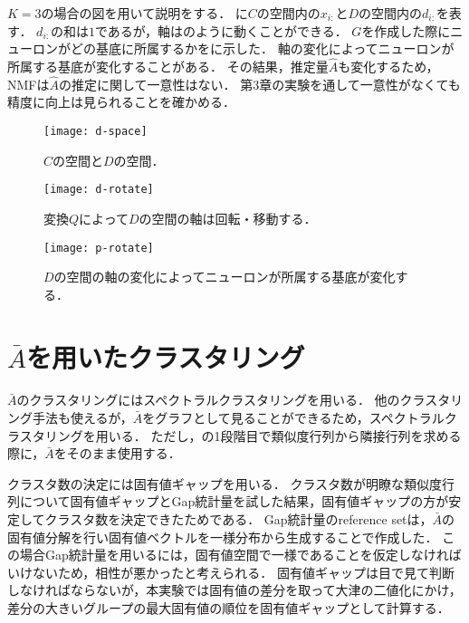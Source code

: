 $K=3$の場合の図を用いて説明をする．
に$C$の空間内の$x_{i:}$と$D$の空間内の$d_{i:}$を表す．
$d_{i:}$の和は$1$であるが，軸はのように動くことができる．
$G$を作成した際にニューロンがどの基底に所属するかをに示した．
軸の変化によってニューロンが所属する基底が変化することがある．
その結果，推定量$\hat{A}$も変化するため，NMFは$\hat{A}$の推定に関して一意性はない．
第3章の実験を通して一意性がなくても精度に向上は見られることを確かめる．

\begin{figure}[htbp]
    \begin{minipage}{0.69\hsize}
			\begin{center}
					\texttt{[image: d-space]}
					\caption{$C$の空間と$D$の空間．}
					\label{fig:d-space}
			\end{center}
		\end{minipage}
    \begin{minipage}{0.3\hsize}
			\begin{center}
					\texttt{[image: d-rotate]}
					\caption{変換$Q$によって$D$の空間の軸は回転・移動する．}
					\label{fig:d-rotate}
			\end{center}
		\end{minipage}
\end{figure}
\begin{figure}[htbp]
		\begin{center}
				\texttt{[image: p-rotate]}
				\caption{$D$の空間の軸の変化によってニューロンが所属する基底が変化する．}
				\label{fig:p-rotate}
		\end{center}
\end{figure}


\section{$\bar{A}$を用いたクラスタリング}
$\bar{A}$のクラスタリングにはスペクトラルクラスタリングを用いる．
他のクラスタリング手法も使えるが，$\bar{A}$をグラフとして見ることができるため，スペクトラルクラスタリングを用いる．
ただし，の1段階目で類似度行列から隣接行列を求める際に，$\bar{A}$をそのまま使用する．

クラスタ数の決定には固有値ギャップを用いる．
クラスタ数が明瞭な類似度行列について固有値ギャップとGap統計量を試した結果，固有値ギャップの方が安定してクラスタ数を決定できたためである．
Gap統計量のreference setは，$\bar{A}$の固有値分解を行い固有値ベクトルを一様分布から生成することで作成した．
この場合Gap統計量を用いるには，固有値空間で一様であることを仮定しなければいけないため，相性が悪かったと考えられる．
固有値ギャップは目で見て判断しなければならないが，本実験では固有値の差分を取って大津の二値化にかけ，差分の大きいグループの最大固有値の順位を固有値ギャップとして計算する．

